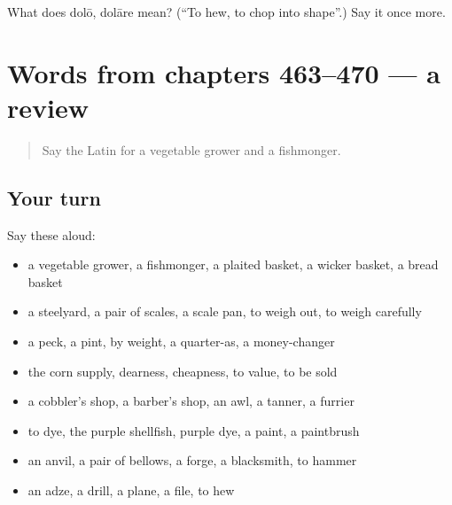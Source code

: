 \begin{tcolorbox}[breakable,colback=teal!4,colframe=teal!35!black,title={Before you move on}]
What does dolō, dolāre mean? (\textquotedblleft{}To hew, to chop into shape\textquotedblright{}.) Say it once more.
\end{tcolorbox}
\section[(dialogue)]{Words from chapters 463–470 — a review}

\label{lesson:LA-R470-review-463-470}



\begin{quote}
Say the Latin for a vegetable grower and a fishmonger.
\end{quote}

\subsection*{Your turn}
Say these aloud:

\begin{itemize}
\raggedright
  \item a vegetable grower, a fishmonger, a plaited basket, a wicker basket, a bread basket
  \item a steelyard, a pair of scales, a scale pan, to weigh out, to weigh carefully
  \item a peck, a pint, by weight, a quarter-as, a money-changer
  \item the corn supply, dearness, cheapness, to value, to be sold
  \item a cobbler's shop, a barber's shop, an awl, a tanner, a furrier
  \item to dye, the purple shellfish, purple dye, a paint, a paintbrush
  \item an anvil, a pair of bellows, a forge, a blacksmith, to hammer
  \item an adze, a drill, a plane, a file, to hew
\end{itemize}

